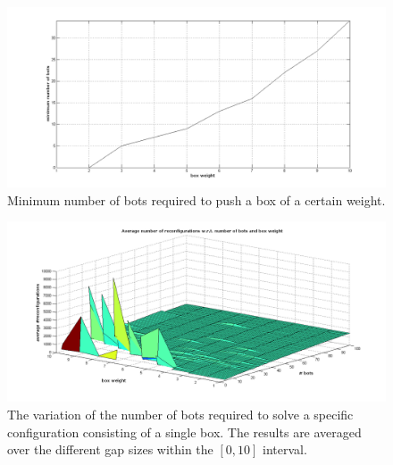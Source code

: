 \begin{figure}[H]
\centerline{\includegraphics[scale=0.4]{images/minimum_no_bots2}}
\caption{Minimum number of bots required to push a box of a certain weight.}
\label{fig:minbots}
\end{figure}

\begin{figure}[H]
\centerline{\includegraphics[scale=0.45]{images/bots_vs_weight}}
\caption{The variation of the number of bots required to solve a specific configuration consisting of a single box. The results are averaged over the different gap sizes within the $[0, 10]$ interval.}
\label{fig:botsvsweight}
\end{figure}
